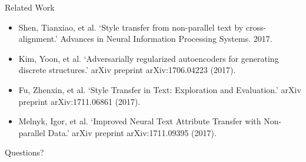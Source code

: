 \documentclass{beamer}
\begin{document}
\begin{frame}{Related Work}
	\begin{itemize}
		\item Shen, Tianxiao, et al. `Style transfer from non-parallel text by cross-alignment.' Advances in Neural Information Processing Systems. 2017.
		\item Kim, Yoon, et al. `Adversarially regularized autoencoders for generating discrete structures.' arXiv preprint arXiv:1706.04223 (2017).
		\item Fu, Zhenxin, et al. `Style Transfer in Text: Exploration and Evaluation.' arXiv preprint arXiv:1711.06861 (2017).
		\item Melnyk, Igor, et al. `Improved Neural Text Attribute Transfer with Non-parallel Data.' arXiv preprint arXiv:1711.09395 (2017).
	\end{itemize}
\end{frame}

\begin{frame}
	\centering
	\Huge{Questions?}
\end{frame}
\end{document}
